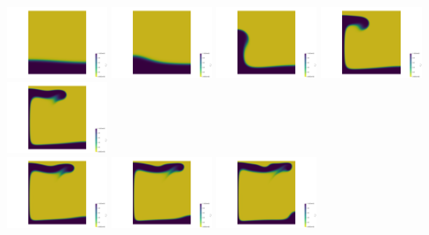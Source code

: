 \begin{itemize}
\begin{center}
\includegraphics[width=3cm]{images/benchmark_vaks97/aspect/lvl7/composition0000}
\includegraphics[width=3cm]{images/benchmark_vaks97/aspect/lvl7/composition0001}
\includegraphics[width=3cm]{images/benchmark_vaks97/aspect/lvl7/composition0002}
\includegraphics[width=3cm]{images/benchmark_vaks97/aspect/lvl7/composition0003}
\includegraphics[width=3cm]{images/benchmark_vaks97/aspect/lvl7/composition0004}\\
\includegraphics[width=3cm]{images/benchmark_vaks97/aspect/lvl7/composition0005}
\includegraphics[width=3cm]{images/benchmark_vaks97/aspect/lvl7/composition0006}
\includegraphics[width=3cm]{images/benchmark_vaks97/aspect/lvl7/composition0007}

\end{center}
\end{itemize}
